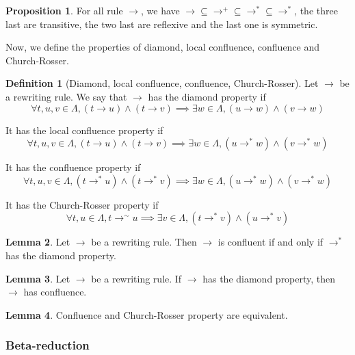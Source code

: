 \documentclass{article}
\theoremstyle{definition}
\newtheorem{defi}{Definition}
\newtheorem{prop}{Proposition}[subsection]
\newtheorem{lem}[prop]{Lemma}
\begin{document}
\begin{prop}
    For all rule $\to$, we have $\to \subseteq \to^+ \subseteq \to^* \subseteq \to^*$, the three last are
    transitive, the two last are reflexive and the last one is symmetric.
\end{prop}

Now, we define the properties of diamond, local confluence, confluence and Church-Rosser.

\begin{defi}[Diamond, local confluence, confluence, Church-Rosser]
    Let $\to$ be a rewriting rule. We say that $\to$ has the diamond property if
    $$\forall t,u,v\in\Lambda, (t \to u) \land (t\to v) \implies \exists w \in\Lambda, (u\to w)\land
    (v \to w)$$

    It has the local confluence property if
    $$\forall t,u,v\in\Lambda, (t \to u) \land (t\to v) \implies \exists w \in\Lambda, (u\to^* w)\land
    (v \to^* w)$$

    It has the confluence property if
    $$\forall t,u,v\in\Lambda, (t \to^* u) \land (t\to^* v) \implies \exists w \in\Lambda, (u\to^* w)\land
    (v \to^* w)$$

    It has the Church-Rosser property if
    $$\forall t,u \in \Lambda, t \to^\sim u \implies \exists v \in\Lambda, (t\to^* v)\land (u \to^* v)$$
\end{defi}

\begin{lem}
    Let $\to$ be a rewriting rule. Then $\to$ is confluent if and only if $\to^*$ has the diamond property.
\end{lem}

\begin{lem}
    Let $\to$ be a rewriting rule. If $\to$ has the diamond property, then $\to$ has confluence.
\end{lem}

\begin{lem}
    Confluence and Church-Rosser property are equivalent.
\end{lem}

\subsubsection{Beta-reduction}
\end{document}
